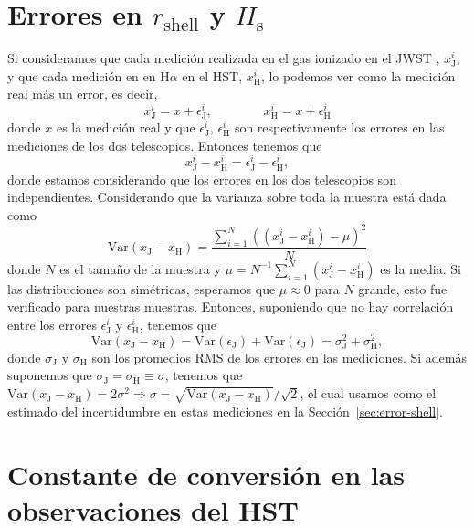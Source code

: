 \documentclass{book}
\begin{document}
\chapter{Errores en $r_\mathrm{shell}$ y $H_\mathrm{s}$}\label{AP: errores r_s H_s}

Si consideramos que cada medición realizada en el gas ionizado en el JWST , $x_\mathrm{J}^i$, y que cada medición en en H$\alpha$ en el HST, $x_\mathrm{H}^i$, lo podemos ver como la medición real más un error, es decir,
\begin{equation}
    x_\mathrm{J}^i=x+\epsilon_\mathrm{J}^i,  \qquad
    \qquad
    x_\mathrm{H}^i=x+\epsilon_\mathrm{H}^i
\end{equation}
donde $x$ es la medición real y que $\epsilon_\mathrm{J}^i$, $\epsilon_\mathrm{H}^i$ son respectivamente los errores en las mediciones de los dos telescopios. Entonces tenemos que
\begin{equation}
    x_\mathrm{J}^i-x_\mathrm{H}^i=\epsilon_\mathrm{J}^i-\epsilon_\mathrm{H}^i,
\end{equation}
donde estamos considerando que los errores en los dos telescopios son independientes. Considerando que la varianza sobre toda la muestra está dada como
\begin{equation}
    \mathrm{Var}(x_\mathrm{J}-x_\mathrm{H})=\frac{\sum_{i=1}^N ((x_\mathrm{J}^i-x_\mathrm{H}^i)-\mu)^2}{N}
\end{equation}
donde $N$ es el tamaño de la muestra y $\mu = N^{-1} \sum_{i=1}^N (x_\mathrm{J}^i-x_\mathrm{H}^i)$ es la media. 
Si las distribuciones son simétricas, esperamos que $\mu \approx 0$ para $N$ grande, esto fue verificado para nuestras muestras.
Entonces, suponiendo que no hay correlación entre los errores $\epsilon_\mathrm{J}^i$ y $\epsilon_\mathrm{H}^i$, tenemos que
\begin{equation}
    \mathrm{Var}(x_\mathrm{J}-x_\mathrm{H})=\mathrm{Var}(\epsilon_\mathrm{J})+\mathrm{Var}(\epsilon_\mathrm{J})=\sigma_\mathrm{J}^2+\sigma_\mathrm{H}^2,
\end{equation}
donde $\sigma_\mathrm{J}$ y $\sigma_\mathrm{H}$
son los promedios RMS de los errores en las mediciones. 
Si además suponemos que $\sigma_\mathrm{J} = \sigma_\mathrm{H} \equiv   \sigma$, tenemos que $\mathrm{Var}(x_\mathrm{J}-x_\mathrm{H})=2\sigma^2\Rightarrow\sigma=\sqrt{\mathrm{Var}(x_\mathrm{J}-x_\mathrm{H})}/\sqrt{2}$, el cual usamos como el estimado del incertidumbre en estas mediciones en la Sección~\ref{sec:error-shell}.


\chapter{Constante de conversión en las observaciones del HST} \label{AP : conversion EM}
\end{document}
